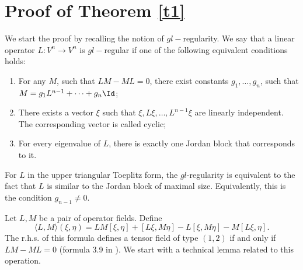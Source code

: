 \documentclass[12pt]{article}
\theoremstyle{remark}
\begin{document}

\section{Proof of Theorem \ref{t1}}\label{proof1}

We start the proof by recalling the notion of $gl-$regularity. We say that a linear operator $L: V^n \to V^n$ is $gl-$regular if one of the following equivalent conditions holds:
\begin{enumerate}
    \item For any $M$, such that $LM - ML = 0$, there exist constants $g_1, \dots, g_n$, such that $M = g_1 L^{n - 1} + \dots + g_n \Id$;
    \item There exists a vector $\xi$ such that $\xi, L\xi, \dots, L^{n - 1}\xi$ are linearly independent. The corresponding vector is called cyclic;
    \item For every eigenvalue of $L$, there is exactly one Jordan block that corresponds to it.
\end{enumerate}
For $L$ in the upper triangular Toeplitz form, the $gl$-regularity is equivalent to the fact that $L$ is similar to the Jordan block of maximal size. Equivalently, this is the condition $g_{n - 1} \neq 0$.

Let $L, M$ be a pair of operator fields. Define 
\begin{equation}\label{ii:eq2}
\langle L, M \rangle (\xi, \eta) = LM[\xi, \eta] + [L\xi, M\eta] - L[\xi, M\eta] - M[L\xi, \eta].
\end{equation}
The r.h.s. of this formula defines a tensor field of type $(1, 2)$ if and only if $LM - ML = 0$ (formula 3.9 in \cite{nijenhuis}). We start with a technical lemma related to this operation. 
\end{document}
